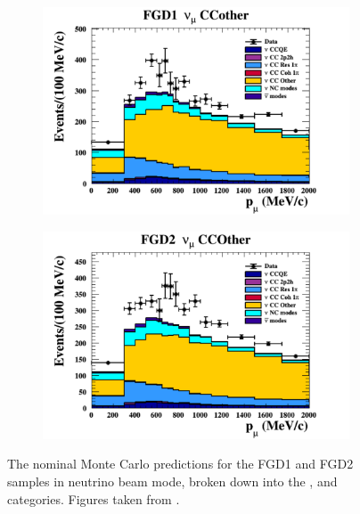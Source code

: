 \begin{figure}[h]
\begin{subfigure}[t]{0.49\textwidth}
    \includegraphics[width=\textwidth, trim={0mm 0mm 0mm 0mm}, clip,page=1]{Figures/Selections/Pmu_1D_modes_FGD1_numuCC_other_Data_prefit.pdf}
  \end{subfigure}%
  \begin{subfigure}[t]{0.49\textwidth}
    \includegraphics[width=\textwidth, trim={0mm 0mm 0mm 0mm}, clip,page=1]{Figures/Selections/Pmu_1D_modes_FGD2_numuCC_other_Data_prefit.pdf}
  \end{subfigure}
  \caption{The nominal Monte Carlo predictions for the FGD1 and FGD2 samples in neutrino beam mode, broken down into the ,  and  categories. Figures taken from \cite{t2k_tn_395}.}
  \label{fig:SelsAndSysts_Beam_NDPred}
\end{figure}

